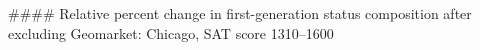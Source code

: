#### Relative percent change in first-generation status composition after excluding Geomarket: Chicago, SAT score 1310–1600
